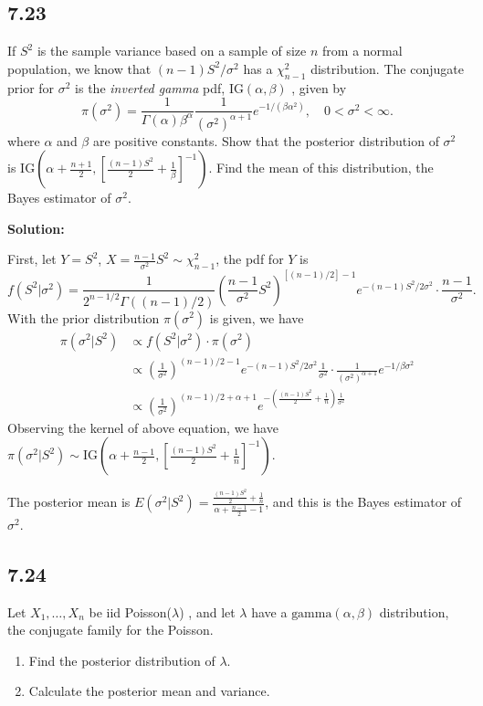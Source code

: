 \documentclass[11pt]{article}
\newcommand{\Sol}{\par {\bf Solution:}}
\newcommand{\sample}[1]{#1_1 , \dots , #1_n}
\begin{document}
\subsection*{7.23}
If $S^2$ is the sample variance based on a sample of size $n$ from a normal population, we know that $(n - 1 ) S^2/\sigma^2$ has a $\chi_{n-1}^2$ distribution. The conjugate prior for $\sigma^2$ is the \emph{inverted gamma} pdf, $\text{IG}(\alpha, \beta)$ , given by
\[
\pi(\sigma^2) = \frac{1}{\Gamma(\alpha)\beta^\alpha}\frac{1}{(\sigma^2)^{\alpha + 1}}e^{-1/(\beta\alpha^2)}, \quad 0 < \sigma^2 < \infty.
\]
where $\alpha$ and $\beta$ are positive constants. Show that the posterior distribution of $\sigma^2$ is $\text{IG}(\alpha + \frac{n+1}{2}, [\frac{(n-1)S^2}{2} + \frac{1}{\beta}]^{-1})$. Find the mean of this distribution, the Bayes estimator of $\sigma^2$.

\Sol

First, let $Y = S^2$, $X = \frac{n-1}{\sigma^2}S^2 \sim \chi^2_{n-1}$, the pdf for $Y$ is
\[
f(S^2|\sigma^2) = \frac{1}{2^{n-1/2}\Gamma((n-1)/2)}(\frac{n-1}{\sigma^2}S^2)^{[(n-1)/2] - 1}e^{-(n-1)S^2/2\sigma^2} \cdot \frac{n-1}{\sigma^2}.
\]
With the prior distribution $\pi(\sigma^2)$ is given, we have
\begin{align*}
    \pi(\sigma^2|S^2) &\propto f(S^2|\sigma^2) \cdot \pi(\sigma^2) \\
    &\propto (\frac{1}{\sigma^2})^{(n-1)/2 - 1} e^{-(n-1)S^2/2\sigma^2} \frac{1}{\sigma^2} \cdot 
    \frac{1}{(\sigma^2)^{\alpha + 1}}e^{-1/\beta\sigma^2} \\
    &\propto (\frac{1}{\sigma^2})^{(n-1)/2 + \alpha + 1} e^{-(\frac{(n-1)S^2}{2} + \frac{1}{n})\frac{1}{\sigma^2}}
\end{align*}
Observing the kernel of above equation, we have
$\pi(\sigma^2|S^2) \sim \text{IG}(\alpha + \frac{n-1}{2}, [\frac{(n-1)S^2}{2} + \frac{1}{n}]^{-1}).$

The posterior mean is $E(\sigma^2|S^2) = \frac{\frac{(n-1)S^2}{2} + \frac{1}{n}}{\alpha + \frac{n-1}{2} - 1}$, and this is the Bayes estimator of $\sigma^2$.

\subsection*{7.24}

Let $\sample{X}$ be iid Poisson($\lambda$) , and let $\lambda$ have a $\text{gamma}(\alpha, \beta)$ distribution, the conjugate family for the Poisson.
\begin{enumerate}[label=(\alph*)]
    \item Find the posterior distribution of $\lambda$.
    \item Calculate the posterior mean and variance.
    
\end{enumerate}
\end{document}
